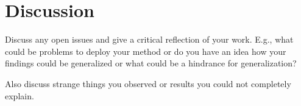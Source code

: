 \chapter{Discussion} \label{sec:discussion}

Discuss any open issues and give a critical reflection of your work. E.g., what could be problems to deploy your method or do you have an idea how your findings could be generalized or what could be a hindrance for generalization?

Also discuss strange things you observed or results you could not completely explain. 

\newpage
